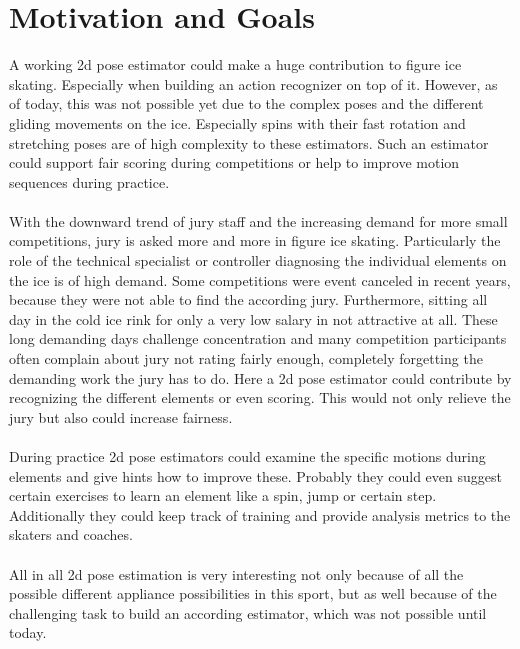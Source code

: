 

\section{Motivation and Goals}

    A working 2d pose estimator could make a huge contribution to figure ice skating.
    Especially when building an action recognizer on top of it.
    However, as of today, this was not possible yet due to the complex poses and the different gliding movements
    on the ice.
    Especially spins with their fast rotation and stretching poses are of high complexity to these estimators.
    Such an estimator could support fair scoring during competitions or help to improve motion sequences during
    practice.
    \\\mbox{}\\
    With the downward trend of jury staff and the increasing demand for more small competitions, jury is asked
    more and more in figure ice skating.
    Particularly the role of the technical specialist or controller diagnosing the individual elements on the ice
    is of high demand.
    Some competitions were event canceled in recent years, because they were not able to find the according jury.
    Furthermore, sitting all day in the cold ice rink for only a very low salary in not attractive at all.
    These long demanding days challenge concentration and many competition participants often complain about jury
    not rating fairly enough,
    completely forgetting the demanding work the jury has to do.
    Here a 2d pose estimator could contribute by recognizing the different elements or even scoring.
    This would not only relieve the jury but also could increase fairness.
    \\\mbox{}\\
    During practice 2d pose estimators could examine the specific motions during elements and give hints how to
    improve these.
    Probably they could even suggest certain exercises to learn an element like a spin, jump or certain step.
    Additionally they could keep track of training and provide analysis metrics to the skaters and coaches.
    \\\mbox{}\\
    All in all 2d pose estimation is very interesting not only because of all the possible different appliance
    possibilities in this sport,
    but as well because of the
    challenging task to build an according estimator, which was not possible until today.

